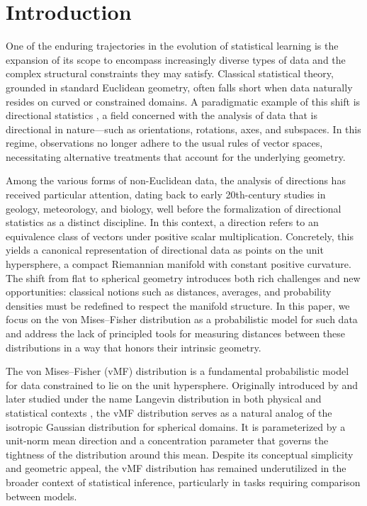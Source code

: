 \documentclass[10pt]{article}
\begin{document}
\section{Introduction}


One of the enduring trajectories in the evolution of statistical learning is the expansion of its scope to encompass increasingly diverse types of data and the complex structural constraints they may satisfy. Classical statistical theory, grounded in standard Euclidean geometry, often falls short when data naturally resides on curved or constrained domains. A paradigmatic example of this shift is directional statistics \citep{mardia_2000_DirectionalStatistics, ley_2017_ModernDirectionalStatistics}, a field concerned with the analysis of data that is directional in nature—such as orientations, rotations, axes, and subspaces. In this regime, observations no longer adhere to the usual rules of vector spaces, necessitating alternative treatments that account for the underlying geometry.

Among the various forms of non-Euclidean data, the analysis of directions has received particular attention, dating back to early 20th-century studies in geology, meteorology, and biology, well before the formalization of directional statistics as a distinct discipline. In this context, a direction refers to an equivalence class of vectors under positive scalar multiplication. Concretely, this yields a canonical representation of directional data as points on the unit hypersphere, a compact Riemannian manifold with constant positive curvature. The shift from flat to spherical geometry introduces both rich challenges and new opportunities: classical notions such as distances, averages, and probability densities must be redefined to respect the manifold structure. In this paper, we focus on the von Mises–Fisher distribution as a probabilistic model for such data and address the lack of principled tools for measuring distances between these distributions in a way that honors  their intrinsic geometry.

The von Mises–Fisher (vMF) distribution is a fundamental probabilistic model for data constrained to lie on the unit hypersphere. Originally introduced by \citet{fisher_1953_DispersionSphere} and later studied under the name Langevin distribution in both physical and statistical contexts \citep{watson_1984_TheoryConcentratedLangevin, watamori_1996_StatisticalInferenceLangevin}, the vMF distribution serves as a natural analog of the isotropic Gaussian distribution for spherical domains. It is parameterized by a unit-norm mean direction and a concentration parameter that governs the tightness of the distribution around this mean. Despite its conceptual simplicity and geometric appeal, the vMF distribution has remained underutilized in the broader context of statistical inference, particularly in tasks requiring comparison between models.
\end{document}
